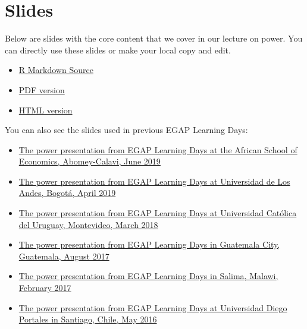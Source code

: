 \documentclass[12pt,]{book}
\begin{document}
\hypertarget{slides-5}{%
\section{Slides}\label{slides-5}}

Below are slides with the core content that we cover in our lecture on power. You can directly use these slides or make your local copy and edit.

\begin{itemize}
\item
  \href{https://egap.github.io/learningdays-resources/Slides/power-slides.Rmd}{R Markdown Source}
\item
  \href{https://egap.github.io/learningdays-resources/Slides/power-slides.pdf}{PDF version}
\item
  \href{https://egap.github.io/learningdays-resources/Slides/power-slides.html}{HTML version}
\end{itemize}

You can also see the slides used in previous EGAP Learning Days:

\begin{itemize}
\item
  \href{https://egap.github.io/learningdays-resources/Slides/Examples/power-benin.pdf}{The power presentation from EGAP Learning Days at the African School of Economics, Abomey-Calavi, June 2019}
\item
  \href{https://egap.github.io/learningdays-resources/Slides/Examples/power-bogota.pdf}{The power presentation from EGAP Learning Days at Universidad de Los Andes, Bogotá, April 2019}
\item
  \href{https://egap.github.io/learningdays-resources/Slides/Examples/power-montevideo.pdf}{The power presentation from EGAP Learning Days at Universidad Católica del Uruguay, Montevideo, March 2018}
\item
  \href{https://egap.github.io/learningdays-resources/Slides/Examples/power-guatemala.html}{The power presentation from EGAP Learning Days in Guatemala City, Guatemala, August 2017}
\item
  \href{https://egap.github.io/learningdays-resources/Slides/Examples/power-malawi.pdf}{The power presentation from EGAP Learning Days in Salima, Malawi, February 2017}
\item
  \href{https://egap.github.io/learningdays-resources/Slides/Examples/power-santiago.pdf}{The power presentation from EGAP Learning Days at Universidad Diego Portales in Santiago, Chile, May 2016}
\end{itemize}
\end{document}
